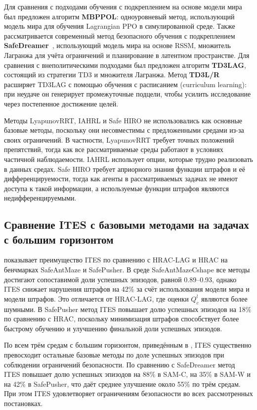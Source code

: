Для сравнения с подходами обучения с подкреплением на основе модели мира был предложен алгоритм \textbf{MBPPOL}: одноуровневый метод, использующий модель мира для обучения Lagrangian PPO в симулированной среде. Также рассматривается современный метод безопасного обучения с подкреплением \textbf{SafeDreamer}~\cite{safedreamer}, использующий модель мира на основе RSSM, множитель Лагранжа для учёта ограничений и планирование в латентном пространстве. Для сравнения с внеполитическими подходами был предложен алгоритм \textbf{TD3LAG}, состоящий из стратегии TD3 и множителя Лагранжа. Метод \textbf{TD3L/R} расширяет TD3LAG с помощью обучения с расписанием (curriculum learning): при неудаче он генерирует промежуточные подцели, чтобы усилить исследование через постепенное достижение целей.

Методы LyapunovRRT, IAHRL и Safe HIRO не использовались как основные базовые методы, поскольку они несовместимы с предложенными средами из-за своих ограничений. В частности, LyapunovRRT требует точных положений препятствий, тогда как все рассматриваемые среды работают в условиях частичной наблюдаемости. IAHRL использует опции, которые трудно реализовать в данных средах. Safe HIRO требует априорного знания функции штрафов и её дифференцируемости, тогда как агенты в рассматриваемых задачах не имеют доступа к такой информации, а используемые функции штрафов являются недифференцируемыми.

\subsection{Сравнение ITES с базовыми методами на задачах с большим горизонтом}
\label{subsec:ites_rq2}

 показывает преимущество ITES по сравнению с HRAC-LAG и HRAC на бенчмарках SafeAntMaze и SafePusher. В среде SafeAntMazeCshape все методы достигают сопоставимой доли успешных эпизодов, равной 0.89--0.93, однако ITES снижает нарушения штрафов на 42\% за счёт использования модели мира и модели штрафов. Это отличается от HRAC-LAG, где оценки $Q^l_c$ являются более шумными. В SafePusher метод ITES повышает долю успешных эпизодов на 18\% по сравнению с HRAC, поскольку минимизация штрафов способствует более быстрому обучению и улучшению финальной доли успешных эпизодов.

По всем трём средам с большим горизонтом, приведённым в , ITES существенно превосходит остальные базовые методы по доле успешных эпизодов при соблюдении ограничений безопасности. По сравнению с SafeDreamer метод ITES повышает долю успешных эпизодов на 88\% в SAM-C, на 35\% в SAM-W и на 42\% в SafePusher, что даёт среднее улучшение около 55\% по трём средам. При этом ITES удовлетворяет ограничениям безопасности во всех рассмотренных постановках.

